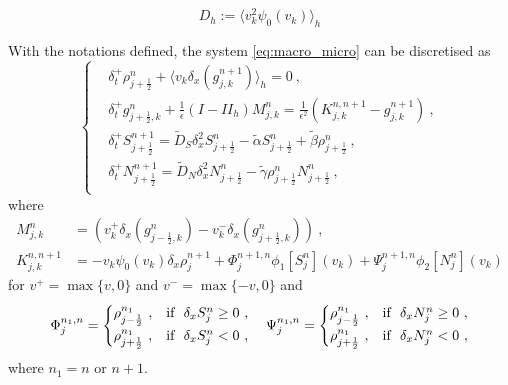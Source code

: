 \documentclass[11pt,twoside]{article}
\begin{document}
$$D_h:=\langle v_k^2\psi_0(v_k)\rangle_h$$

 
  With the notations defined, the system \ref{eq:macro_micro} can be discretised as
   \begin{equation}
\begin{cases}\label{eq: main scheme}
   &\delta_t^+\rho_{j+\frac{1}{2}}^n +\langle v_k \delta_x (g_{j,k}^{n+1})\rangle_h=0\ ,\\
   
        &\delta_t^+ g_{j+\frac{1}{2},k}^n + \frac{1}{\epsilon}(I-II_h)M_{j,k}^n =\frac{1}{\epsilon^2}(K_{j,k}^{n,n+1}-g_{j,k}^{n+1})\ ,\\
        
        &\delta_t^+S_{j+\frac{1}{2}}^{n+1} = \tilde{D}_S \delta _x^2S_{j+\frac{1}{2}}^{n}-\tilde{\alpha} S_{j+\frac{1}{2}}^{n}+\tilde{\beta}\rho_{j+\frac{1}{2}}^{n}\ ,\\
        
     &\delta_t^+N_{j+\frac{1}{2}}^{n+1} = \tilde{D}_N \delta _x^2N_{j+\frac{1}{2}}^{n}-\tilde{\gamma} \rho_{j+\frac{1}{2}}^{n}N_{j+\frac{1}{2}}^{n}\ ,\\
   \end{cases}
   \end{equation}
where
\begin{align}
M_{j,k}^n&=(v_k^+\delta_x(g_{j-\frac{1}{2},k}^n)-v_k^-\delta_x(g_{j+\frac{1}{2},k}^n))\ ,\\
K_{j,k}^{n,n+1}
& = -v_k\psi_0(v_k)\delta_x\rho_{j}^{n+1}+{\Phi^{n+1,n}_{j}\phi_1[S_{j}^n](v_k)+\Psi^{n+1,n}_{j}\phi_2[N_{j}^n](v_k)}
\end{align}
for $v^+=\max\{v,0\}$ and $v^-=\max\{-v,0\}$ and 
\[
\Phi^{n_1,n}_{j}=\begin{cases}
     \rho^{n_1}_{j-\frac{1}{2}}\ ,  &\textnormal{if}\ \  \delta_x S_{j}^n\geq 0\ ,\\
    \rho^{n_1}_{j+\frac{1}{2}}\ , &\textnormal{if}\ \ \delta_x S_{j}^n< 0\ ,
\end{cases}
\quad \Psi^{n_1,n}_{j}=\begin{cases}
     \rho^{n_1}_{j-\frac{1}{2}}\ , & \textnormal{if}\ \  \delta_x N_{j}^n\geq 0\ ,\\
    \rho^{n_1}_{j+\frac{1}{2}}\ , & \textnormal{if}\ \ \delta_x N_{j}^n< 0\ ,
    \end{cases}
\]
where $n_1=n$ or $n+1$.
\end{document}
